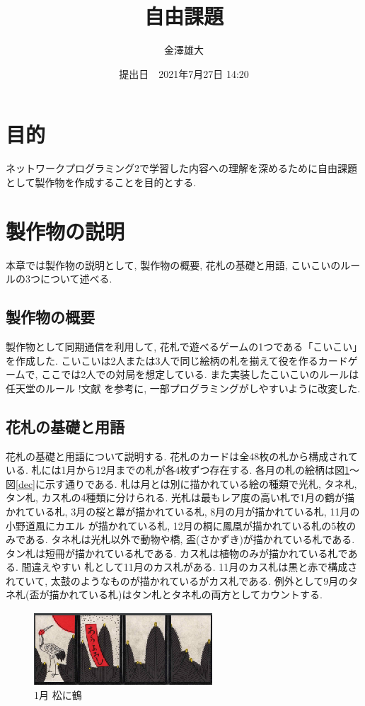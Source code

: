 \documentclass[a4j]{jarticle}
\title{自由課題}
\date{提出日　2021年7月27日 14:20}
\author{金澤雄大}
\begin{document}
    \maketitle
    \thispagestyle{empty}
    \clearpage
    \addtocounter{page}{-1}
    \section{目的}
    ネットワークプログラミング2で学習した内容への理解を深めるために自由課題として製作物を作成することを目的とする.

    \section{製作物の説明}
    本章では製作物の説明として, 製作物の概要, 花札の基礎と用語, こいこいのルールの3つについて述べる.
    \subsection{製作物の概要}
    製作物として同期通信を利用して, 花札で遊べるゲームの1つである「こいこい」を作成した. こいこいは2人または3人で同じ絵柄の札を揃えて役を作るカードゲームで, ここでは2人での対局を想定している.
    また実装したこいこいのルールは任天堂のルール !文献 を参考に, 一部プログラミングがしやすいように改変した.

    \subsection{花札の基礎と用語}
    花札の基礎と用語について説明する. 花札のカードは全48枚の札から構成されている. 札には1月から12月までの札が各4枚ずつ存在する. 各月の札の絵柄は図\ref{jan}～図\ref{dec}に示す通りである.
    札は月とは別に描かれている絵の種類で光札, タネ札, タン札, カス札の4種類に分けられる. 光札は最もレア度の高い札で1月の鶴が描かれている札, 3月の桜と幕が描かれている札, 8月の月が描かれている札, 11月の小野道風にカエル
    が描かれている札, 12月の桐に鳳凰が描かれている札の5枚のみである. タネ札は光札以外で動物や橋, 盃(さかずき)が描かれている札である. タン札は短冊が描かれている札である. カス札は植物のみが描かれている札である. 間違えやすい
    札として11月のカス札がある. 11月のカス札は黒と赤で構成されていて, 太鼓のようなものが描かれているがカス札である. 例外として9月のタネ札(盃が描かれている札)はタン札とタネ札の両方としてカウントする.
    
    \begin{figure}[H]
    \centering
    \includegraphics[scale=1.5]{./img/jan.eps}
    \caption{1月 松に鶴}
    \label{jan}
    \end{figure}
\end{document}
